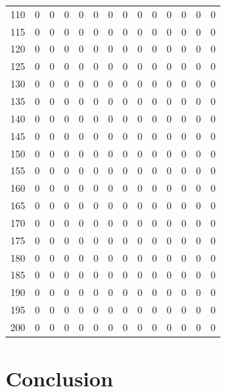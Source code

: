 \documentclass[preprint,12pt]{elsarticle}
\begin{document}
\begin{table}
\begin{tabular}{|c||rrr|r||rr|r||rr|r||rr|r|}
  110 &   0 &   0 &   0 &  0 &   0 &   0 &   0 &   0 &   0 &   0 &   0&   0&   0\\ 
  115 &   0 &   0 &   0 &  0 &   0 &   0 &   0 &   0 &   0 &   0 &   0&   0&   0\\ 
  120 &   0 &   0 &   0 &  0 &   0 &   0 &   0 &   0 &   0 &   0 &   0&   0&   0\\ 
  125 &   0 &   0 &   0 &  0 &   0 &   0 &   0 &   0 &   0 &   0 &   0&   0&   0\\ 
  130 &   0 &   0 &   0 &  0 &   0 &   0 &   0 &   0 &   0 &   0 &   0&   0&   0\\ 
  135 &   0 &   0 &   0 &  0 &   0 &   0 &   0 &   0 &   0 &   0 &   0&   0&   0\\ 
  140 &   0 &   0 &   0 &  0 &   0 &   0 &   0 &   0 &   0 &   0 &   0&   0&   0\\ 
  145 &   0 &   0 &   0 &  0 &   0 &   0 &   0 &   0 &   0 &   0 &   0&   0&   0\\ 
  150 &   0 &   0 &   0 &  0 &   0 &   0 &   0 &   0 &   0 &   0 &   0&   0&   0\\ 
  155 &   0 &   0 &   0 &  0 &   0 &   0 &   0 &   0 &   0 &   0 &   0&   0&   0\\ 
  160 &   0 &   0 &   0 &  0 &   0 &   0 &   0 &   0 &   0 &   0 &   0&   0&   0\\ 
  165 &   0 &   0 &   0 &  0 &   0 &   0 &   0 &   0 &   0 &   0 &   0&   0&   0\\ 
  170 &   0 &   0 &   0 &  0 &   0 &   0 &   0 &   0 &   0 &   0 &   0&   0&   0\\ 
  175 &   0 &   0 &   0 &  0 &   0 &   0 &   0 &   0 &   0 &   0 &   0&   0&   0\\ 
  180 &   0 &   0 &   0 &  0 &   0 &   0 &   0 &   0 &   0 &   0 &   0&   0&   0\\ 
  185 &   0 &   0 &   0 &  0 &   0 &   0 &   0 &   0 &   0 &   0 &   0&   0&   0\\ 
  190 &   0 &   0 &   0 &  0 &   0 &   0 &   0 &   0 &   0 &   0 &   0&   0&   0\\ 
  195 &   0 &   0 &   0 &  0 &   0 &   0 &   0 &   0 &   0 &   0 &   0&   0&   0\\ 
  200 &   0 &   0 &   0 &  0 &   0 &   0 &   0 &   0 &   0 &   0 &   0&   0&   0\\ 
   \hline
\end{tabular}
\end{table}

\section{Conclusion}\label{sec:conc}
\end{document}
